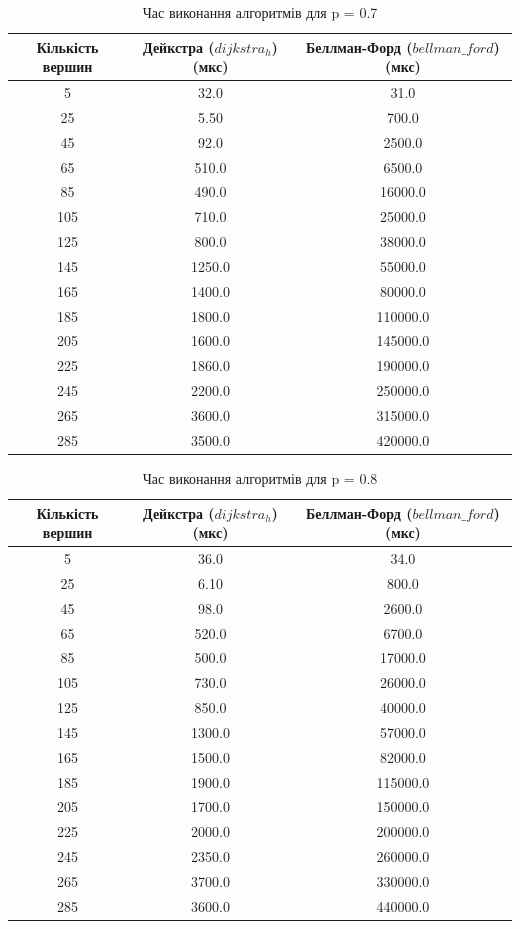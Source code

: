 \documentclass[a4paper,12pt]{article}
\begin{document}
\begin{table}[ht]
    \centering
    \caption{Час виконання алгоритмів для p = 0.7}
    \begin{tabular}{|c|c|c|}
        \hline
        Кількість вершин & Дейкстра ($dijkstra_h$) (мкс) & Беллман-Форд ($bellman\_ford$) (мкс) \\
        \hline
        5   & 32.0    & 31.0 \\
        25  & 5.50    & 700.0 \\
        45  & 92.0    & 2500.0 \\
        65  & 510.0   & 6500.0 \\
        85  & 490.0   & 16000.0 \\
        105 & 710.0   & 25000.0 \\
        125 & 800.0   & 38000.0 \\
        145 & 1250.0  & 55000.0 \\
        165 & 1400.0  & 80000.0 \\
        185 & 1800.0  & 110000.0 \\
        205 & 1600.0  & 145000.0 \\
        225 & 1860.0  & 190000.0 \\
        245 & 2200.0  & 250000.0 \\
        265 & 3600.0  & 315000.0 \\
        285 & 3500.0  & 420000.0 \\
        \hline
    \end{tabular}
    \label{tab:data_0.7}
\end{table}

\begin{table}[ht]
    \centering
    \caption{Час виконання алгоритмів для p = 0.8}
    \begin{tabular}{|c|c|c|}
        \hline
        Кількість вершин & Дейкстра ($dijkstra_h$) (мкс) & Беллман-Форд ($bellman\_ford$) (мкс) \\
        \hline
        5   & 36.0    & 34.0 \\
        25  & 6.10    & 800.0 \\
        45  & 98.0    & 2600.0 \\
        65  & 520.0   & 6700.0 \\
        85  & 500.0   & 17000.0 \\
        105 & 730.0   & 26000.0 \\
        125 & 850.0   & 40000.0 \\
        145 & 1300.0  & 57000.0 \\
        165 & 1500.0  & 82000.0 \\
        185 & 1900.0  & 115000.0 \\
        205 & 1700.0  & 150000.0 \\
        225 & 2000.0  & 200000.0 \\
        245 & 2350.0  & 260000.0 \\
        265 & 3700.0  & 330000.0 \\
        285 & 3600.0  & 440000.0 \\
        \hline
    \end{tabular}
    \label{tab:data_0.8}
\end{table}
\end{document}
